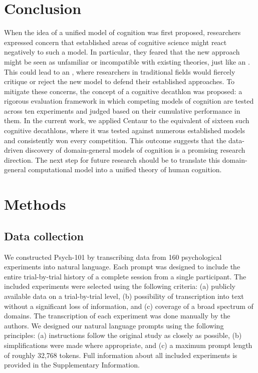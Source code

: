 \documentclass[pdflatex,sn-nature]{sn-jnl}%
\theoremstyle{thmstyleone}%
\theoremstyle{thmstyletwo}%
\theoremstyle{thmstylethree}%
\begin{document}
\section*{Conclusion}

When the idea of a unified model of cognition was first proposed, researchers expressed concern that established areas of cognitive science might react negatively to such a model. In particular, they feared that the new approach might be seen as unfamiliar or incompatible with existing theories, just like an  \cite{vere1992cognitive}. This could lead to an , where researchers in traditional fields would fiercely critique or reject the new model to defend their established approaches. To mitigate these concerns, the concept of a cognitive decathlon was proposed: a rigorous evaluation framework in which competing models of cognition are tested across ten experiments and judged based on their cumulative performance in them. In the current work, we applied Centaur to the equivalent of sixteen such cognitive decathlons, where it was tested against numerous established models and consistently won every competition. This outcome suggests that the data-driven discovery of domain-general models of cognition is a promising research direction. The next step for future research should be to translate this domain-general computational model into a unified theory of human cognition.

\newpage 

\section*{Methods}\label{sec11}

\subsection*{Data collection}

We constructed Psych-101 by transcribing data from 160 psychological experiments into natural language. Each prompt was designed to include the entire trial-by-trial history of a complete session from a single participant. The included experiments were selected using the following criteria: (a) publicly available data on a trial-by-trial level, (b) possibility of transcription into text without a significant loss of information, and (c) coverage of a broad spectrum of domains. The transcription of each experiment was done manually by the authors. We designed our natural language prompts using the following principles: (a) instructions follow the original study as closely as possible, (b) simplifications were made where appropriate, and (c) a maximum prompt length of roughly 32,768 tokens. Full information about all included experiments is provided in the Supplementary Information.
\end{document}
